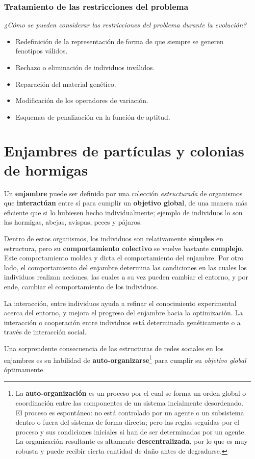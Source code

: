 \documentclass[10pt,a4paper]{article}
\begin{document}
\subsubsection{Tratamiento de las restricciones del problema}

\textit{¿Cómo se pueden considerar las restricciones del problema durante la evolución?}

\begin{itemize}
\item Redefinición de la representación de forma de que siempre se generen fenotipos válidos.
\item Rechazo o eliminación de individuos inválidos.
\item Reparación del material genético.
\item Modificación de los operadores de variación.
\item Esquemas de penalización en la función de aptitud.
\end{itemize}


\section{Enjambres de partículas y colonias de hormigas}

Un \textbf{enjambre} puede ser definido por una colección \textit{estructurada} de organismos que \textbf{interactúan} entre sí para cumplir un \textbf{objetivo global}, de una manera más eficiente que si lo hubiesen hecho individualmente; ejemplo de individuos lo son las hormigas, abejas, avispas, peces y pájaros. 

Dentro de estos organismos, los individuos son relativamente \textbf{simples} en estructura, pero su \textbf{comportamiento colectivo} se vuelve bastante \textbf{complejo}. Este comportamiento moldea y dicta el comportamiento del enjambre. Por otro lado, el comportamiento del enjambre determina las condiciones en las cuales los individuos realizan acciones, las cuales a su vez pueden cambiar el entorno, y por ende, cambiar el comportamiento de los individuos.

La interacción, entre individuos ayuda a refinar el conocimiento experimental acerca del entorno, y mejora el progreso del enjambre hacia la optimización. La interacción o cooperación entre individuos está determinada genéticamente o a través de interacción social.

Una sorprendente consecuencia de las estructuras de redes sociales en los enjambres es su habilidad de \textbf{auto-organizarse}\footnote{La \textbf{auto-organización} es un proceso por el cual se forma un orden global o coordinación entre las componentes de un sistema incialmente desordenado. El proceso es espontáneo: no está controlado por un agente o un subsistema dentro o fuera del sistema de forma directa; pero las reglas seguidas por el proceso y sus condiciones iniciales si han de ser determinadas por un agente. La organización resultante es altamente \textbf{descentralizada}, por lo que es muy robusta y puede recibir cierta cantidad de daño antes de degradarse.} para cumplir su \textit{objetivo global} óptimamente.
\end{document}
